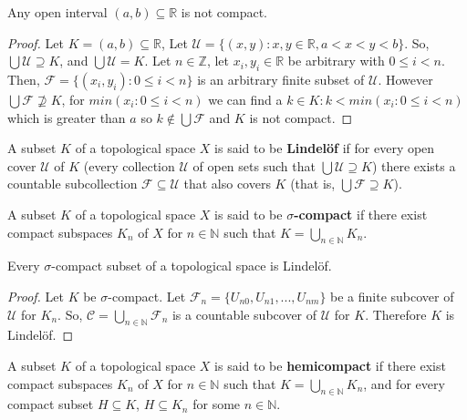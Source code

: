 \documentclass{article}
\begin{document}
	\begin{proposition}
	  Any open interval \((a,b)\subseteq\mathbb R\) is not compact.
	\end{proposition}
	\begin{proof}
	Let $K = (a, b) \subseteq \mathbb{R}$, Let $\mathcal{U} = \lbrace (x, y) : x, y \in \mathbb{R}, a < x < y < b \rbrace$. So, $\bigcup \mathcal{U} \supseteq K$, and $\bigcup \mathcal{U} = K$. Let $n \in \mathbb{Z}$, let $x_i, y_i \in \mathbb{R}$ be arbitrary with $0 \leq i < n$. Then, $\mathcal{F} = \lbrace (x_i, y_i) : 0 \leq i < n \rbrace$ is an arbitrary finite subset of $\mathcal{U}$. However $\bigcup \mathcal{F} \not\supseteq K$, for $min(x_i : 0 \leq i < n)$ we can find a $k \in K : k < min(x_i : 0 \leq i < n)$ which is greater than $a$ so $k \not\in \bigcup \mathcal{F}$ and $K$ is not compact.
	\end{proof}

	\begin{definition}
	  A subset \(K\) of a topological space \(X\) is said to be \textbf{Lindel\"of} if for every
	  open cover \(\mathcal U\) of \(K\) (every collection \(\mathcal U\) of open sets
	  such that \(\bigcup \mathcal U\supseteq K\)) there exists a countable subcollection
	  \(\mathcal F\subseteq \mathcal U\) that also covers \(K\) (that is,
	  \(\bigcup\mathcal F\supseteq K\)).
	\end{definition}

	\begin{definition}
	  A subset \(K\) of a topological space \(X\) is said to be \textbf{\(\sigma\)-compact} if
	  there exist compact subspaces \(K_n\) of \(X\) for \(n\in\mathbb N\) such that
	  \(K=\bigcup_{n\in\mathbb N} K_n\).
	  \newline \newline
	\end{definition}
	\begin{theorem}
		Every \(\sigma\)-compact subset of a topological space is Lindel\"of.
	\end{theorem}
	\begin{proof}
	Let $K$ be \(\sigma\)-compact. Let $\mathcal{F}_n = \lbrace U_{n0}, U_{n1}, ..., U_{nm} \rbrace$ be a finite subcover of $\mathcal{U}$ for $K_n$. So, $\mathcal{C} = \bigcup_{n \in \mathbb{N}} \mathcal{F}_n$ is a countable subcover of $\mathcal{U}$ for $K$. Therefore $K$ is Lindel\"of.
	
	\end{proof}


	\begin{definition}
	  A subset \(K\) of a topological space \(X\) is said to be \textbf{hemicompact} if
	  there exist compact subspaces \(K_n\) of \(X\) for \(n\in\mathbb N\) such that
	  \(K=\bigcup_{n\in\mathbb N} K_n\), and for every compact subset \(H\subseteq K\),
	  \(H\subseteq K_n\) for some \(n\in\mathbb N\).
	\end{definition}
\end{document}

